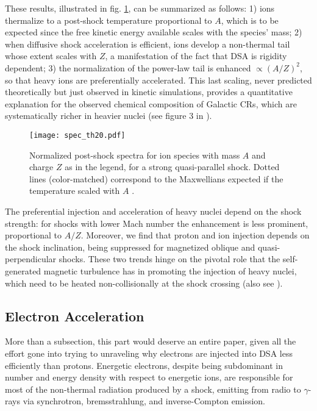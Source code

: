 \documentclass[varenna]{cimento}
\begin{document}
These results, illustrated in fig. \ref{fig:spec}, can be summarized as follows: 
1) ions thermalize to a post-shock temperature proportional to $A$, which is to be expected since the free kinetic energy available scales with the species' mass;
2) when diffusive shock acceleration is efficient, ions develop a non-thermal tail whose extent scales with $Z$, a manifestation of the fact that DSA is rigidity dependent;
3) the normalization of the power-law tail is enhanced $\propto (A/Z)^2$, so that heavy ions are preferentially accelerated.
This last scaling, never predicted theoretically but just observed in kinetic simulations, provides a quantitative  explanation for the observed chemical composition of Galactic CRs, which are systematically richer in heavier nuclei (see figure 3 in \cite{caprioli+17}). 

\begin{figure}
\begin{center}
\texttt{[image: spec\_th20.pdf]}
\caption{Normalized post-shock spectra for ion species with mass $A$ and charge $Z$ as in the legend, for a strong quasi-parallel shock.
Dotted lines (color-matched) correspond to the Maxwellians expected if the temperature scaled with $A$ \cite{caprioli+17}.}
\vspace{-2mm}
\label{fig:spec}
\end{center}
\end{figure}

The preferential injection and acceleration of heavy nuclei depend on the shock strength: for shocks with lower Mach number the enhancement is less prominent, proportional to $A/Z$.
Moreover, we find that proton and ion injection depends on the shock inclination, being suppressed for magnetized oblique and quasi-perpendicular shocks. 
These two trends hinge on the pivotal role that the self-generated magnetic turbulence has in promoting the injection of heavy nuclei, which need to be heated non-collisionally at the shock crossing (also see \cite{hanusch+19a, hanusch+19b}).

\subsection{Electron Acceleration}
More than a subsection, this part would deserve an entire paper, given all the effort gone into trying to unraveling why electrons are injected into DSA less efficiently than protons. 
Energetic electrons, despite being subdominant in number and energy density with respect to energetic ions, are responsible for most of the non-thermal radiation produced by a shock, emitting from radio to $\gamma$-rays via synchrotron, bremsstrahlung, and inverse-Compton emission.
\end{document}
